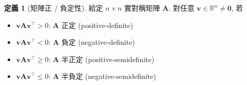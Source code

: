 \documentclass[12pt]{extarticle}
\newcommand{\ds}{\displaystyle}
\theoremstyle{definition}
\newtheorem*{dfn}{定義}
\newcommand{\vv}{\mathbf{v}}
\newcommand{\vA}{\mathbf{A}}
\newcommand{\vZero}{\mathbf{0}}
\begin{document}
\begin{dfn}[矩陣正 / 負定性] 
  給定 $n\times n$ 實對稱矩陣 $\vA$. 對任意 $\ds\vv\in\mathbb{R}^n\ne\vZero$, 若 
  \setlength{\columnsep}{10mm}
  \begin{multicols}{2}
    \begin{itemize}\setlength\itemsep{0em}
      \item $\ds\vv\vA\vv^\top > 0$: $\vA$ 正定 (positive-definite)
      \item $\ds\vv\vA\vv^\top < 0$: $\vA$ 負定 (negative-definite)
      \item $\ds\vv\vA\vv^\top \geqslant 0$: $\vA$ 半正定 (positive-semidefinite)
      \item $\ds\vv\vA\vv^\top \leqslant 0$: $\vA$ 半負定 (negative-semidefinite)
    \end{itemize}
  \end{multicols}
\end{dfn}
\end{document}
